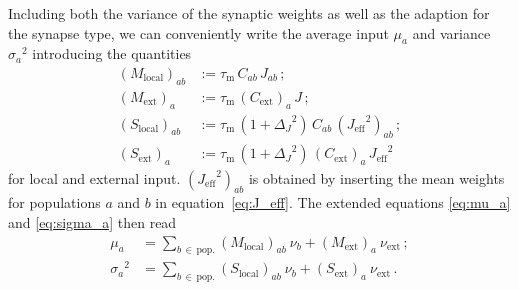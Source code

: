 Including both the variance of the synaptic weights as well as the adaption 
for the synapse type,
we can conveniently write
the average input $\mu_a$ and variance ${\sigma_a}^2$ 
introducing the quantities
\begin{align}
    \label{eq:S_l}
    (M_\text{local})_{ab} 
        &:= \tau_\text{m} \, C_{ab} \,J_{ab} \,;\\ 
    (M_\text{ext})_{a} 
        &:= \tau_\text{m} \, (C_\text{ext})_a \,J \,;\\
    (S_\text{local})_{ab} 
        &:= \tau_\text{m} \,(1 + {\Delta_J}^2) \,C_{ab} \,({J_\text{eff}}^2)_{ab} \,;\\
    (S_\text{ext})_{a} 
        &:= \tau_\text{m} \,(1 + {\Delta_J}^2) \,(C_\text{ext})_a \,{J_\text{eff}}^2 
\end{align}
for local and external input. $({J_\text{eff}}^2)_{ab}$ is obtained by inserting 
the mean weights for populations $a$ and $b$ in equation~\eqref{eq:J_eff}. 
The extended equations \eqref{eq:mu_a} and \eqref{eq:sigma_a} then read
\begin{align}
    \label{eq:mu_a_plus}
    \mu_a        &= 
        \sum_{b \,\in \,\text{pop.}}  (M_\text{local})_{ab} \: \nu_b 
        + (M_\text{ext})_{a} \: \nu_\text{ext} \, ; \\
    \label{eq:sigma_a_plus}
    {\sigma_a}^2 &= 
        \sum_{b \,\in \,\text{pop.}} (S_\text{local})_{ab} \: \nu_b
        + (S_\text{ext})_{a}  \:\nu_\text{ext}\,.
\end{align}


